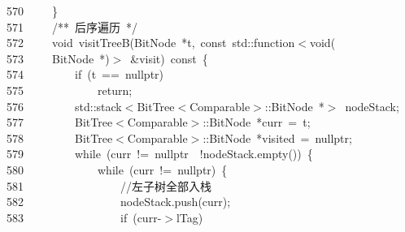\documentclass[11pt,a4paper]{ctexart}
\newcommand{\hlstd}[1]{\textcolor[rgb]{0.2,0.2,0.2}{#1}}
\newcommand{\hlslc}[1]{\textcolor[rgb]{0.59,0.59,0.59}{#1}}
\newcommand{\hlcom}[1]{\textcolor[rgb]{0.59,0.59,0.59}{#1}}
\newcommand{\hlopt}[1]{\textcolor[rgb]{0.2,0.2,0.2}{#1}}
\newcommand{\hllin}[1]{\textcolor[rgb]{0.59,0.59,0.59}{#1}}
\newcommand{\hlkwa}[1]{\textcolor[rgb]{0.23,0.42,0.78}{#1}}
\newcommand{\hlkwb}[1]{\textcolor[rgb]{0.63,0,0.31}{#1}}
\newcommand{\hlkwc}[1]{\textcolor[rgb]{0,0.63,0.31}{#1}}
\newcommand{\hlkwd}[1]{\textcolor[rgb]{0.78,0.23,0.41}{#1}}
\begin{document}
\hllin{570\ }\hlstd{}\hlstd{\ \ \ \ }\hlstd{}\hlopt{\}}\\
\hllin{571\ }\hlstd{}\hlstd{\ \ \ \ }\hlstd{}\hlcom{/{*}{*}\ 后序遍历\ {*}/}\hlstd{}\\
\hllin{572\ }\hlstd{}\hlstd{\ \ \ \ }\hlstd{}\hlkwb{void\ }\hlstd{}\hlkwd{visitTreeB}\hlstd{}\hlopt{(}\hlstd{BitNode\ }\hlopt{{*}}\hlstd{t}\hlopt{,\ }\hlstd{}\hlkwb{const\ }\hlstd{}\hlkwc{std}\hlstd{}\hlopt{::}\hlstd{function}\hlopt{$<$}\hlstd{}\hlkwb{void}\hlstd{}\hlopt{(}\Righttorque\\
\hllin{573\ }\hlstd{}\hlstd{\ \ \ \ }\hlstd{BitNode\ }\hlopt{{*})$>$\ \&}\hlstd{visit}\hlopt{)\ }\hlstd{}\hlkwb{const\ }\hlstd{}\hlopt{\{}\\
\hllin{574\ }\hlstd{}\hlstd{\ \ \ \ \ \ \ \ }\hlstd{}\hlkwa{if\ }\hlstd{}\hlopt{(}\hlstd{t\ }\hlopt{==\ }\hlstd{}\hlkwc{nullptr}\hlstd{}\hlopt{)}\\
\hllin{575\ }\hlstd{}\hlstd{\ \ \ \ \ \ \ \ \ \ \ \ }\hlstd{}\hlkwa{return}\hlstd{}\hlopt{;}\\
\hllin{576\ }\hlstd{}\hlstd{\ \ \ \ \ \ \ \ }\hlstd{}\hlkwc{std}\hlstd{}\hlopt{::}\hlstd{stack}\hlopt{$<$}\hlstd{BitTree}\hlopt{$<$}\hlstd{Comparable}\hlopt{$>$::}\hlstd{BitNode\ }\hlopt{{*}$>$\ }\hlstd{nodeStack}\hlopt{;}\\
\hllin{577\ }\hlstd{}\hlstd{\ \ \ \ \ \ \ \ }\hlstd{BitTree}\hlopt{$<$}\hlstd{Comparable}\hlopt{$>$::}\hlstd{BitNode\ }\hlopt{{*}}\hlstd{curr\ }\hlopt{=\ }\hlstd{t}\hlopt{;}\\
\hllin{578\ }\hlstd{}\hlstd{\ \ \ \ \ \ \ \ }\hlstd{BitTree}\hlopt{$<$}\hlstd{Comparable}\hlopt{$>$::}\hlstd{BitNode\ }\hlopt{{*}}\hlstd{visited\ }\hlopt{=\ }\hlstd{}\hlkwc{nullptr}\hlstd{}\hlopt{;}\\
\hllin{579\ }\hlstd{}\hlstd{\ \ \ \ \ \ \ \ }\hlstd{}\hlkwa{while\ }\hlstd{}\hlopt{(}\hlstd{curr\ }\hlopt{!=\ }\hlstd{}\hlkwc{nullptr\ }\hlstd{}\hlopt{\textbar \textbar \ !}\hlstd{nodeStack}\hlopt{.}\hlstd{}\hlkwd{empty}\hlstd{}\hlopt{())\ \{}\\
\hllin{580\ }\hlstd{}\hlstd{\ \ \ \ \ \ \ \ \ \ \ \ }\hlstd{}\hlkwa{while\ }\hlstd{}\hlopt{(}\hlstd{curr\ }\hlopt{!=\ }\hlstd{}\hlkwc{nullptr}\hlstd{}\hlopt{)\ \{}\\
\hllin{581\ }\hlstd{}\hlstd{\ \ \ \ \ \ \ \ \ \ \ \ \ \ \ \ }\hlstd{}\hlslc{//左子树全部入栈}\\
\hllin{582\ }\hlstd{}\hlstd{\ \ \ \ \ \ \ \ \ \ \ \ \ \ \ \ }\hlstd{nodeStack}\hlopt{.}\hlstd{}\hlkwd{push}\hlstd{}\hlopt{(}\hlstd{curr}\hlopt{);}\\
\hllin{583\ }\hlstd{}\hlstd{\ \ \ \ \ \ \ \ \ \ \ \ \ \ \ \ }\hlstd{}\hlkwa{if\ }\hlstd{}\hlopt{(}\hlstd{curr}\hlopt{{-}$>$}\hlstd{lTag}\hlopt{)}\\
\end{document}
